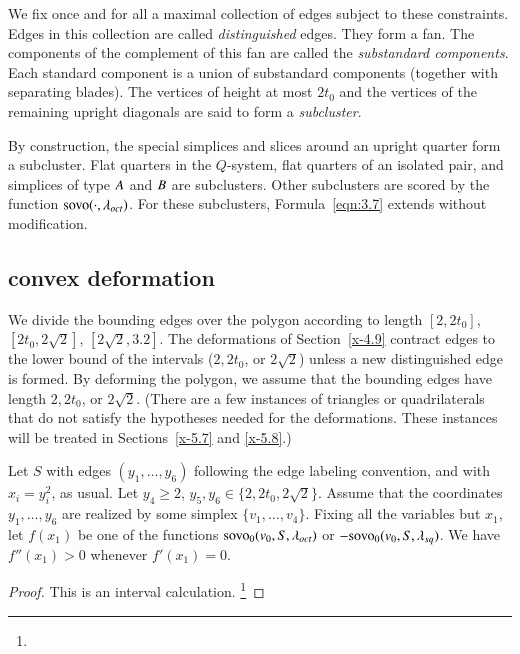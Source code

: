We fix once and for all a maximal collection of edges subject to
these constraints. Edges in this collection are called {\it
distinguished\/} edges.  They form a fan.  The components of the complement
of this fan are
called the {\it substandard components}.  Each standard component is a union of
substandard components (together with separating blades). 
The vertices of height at most $2t_0$ and the vertices
of the remaining upright diagonals are said to form a {\it
subcluster}.


By construction, the special simplices and slices
around an upright quarter form a subcluster.  Flat quarters in the
$Q$-system, flat quarters of an isolated pair, and simplices of
type $A$ and $B$ are subclusters.  Other subclusters are
scored by the function ${\operatorname{sovo}}(\cdot,\lambda_{oct})$. 
For these subclusters,
Formula~\ref{eqn:3.7} extends without modification.


\subsection{convex deformation} %
We divide the bounding edges over the polygon according to length
$[2,2t_0]$, $[2t_0,2\sqrt{2}]$, $[2\sqrt{2},3.2]$. The deformations of
Section~\ref{x-4.9} contract edges to the lower bound of the intervals
($2,2t_0$, or $2\sqrt{2}$) unless a new distinguished edge is formed. By
deforming the polygon, we assume that the bounding edges have length
$2,2t_0$, or $2\sqrt{2}$. (There are a few instances of triangles or
quadrilaterals that do not satisfy the hypotheses needed for the
deformations. These instances will be treated in Sections~\ref{x-5.7}
and \ref{x-5.8}.)

\begin{lemma}
Let $S$ with edges $(y_1,\ldots,y_6)$ following the edge labeling
convention, and with $x_i=y_i^2$,
as usual.  Let $y_4\ge 2$,
    $y_5,y_6\in\{2,2t_0,2\sqrt{2}\}$.
Assume that the coordinates $y_1,\ldots,y_6$ are realized by
some simplex $\{v_1,\ldots,v_4\}$.  %
Fixing all the variables but $x_1$, let $f(x_1)$ be one of the
functions ${\operatorname{sovo}}_0(v_0,S,\lambda_{oct})$ or 
$-{\operatorname{sovo}}_0(v_0,S,\lambda_{sq})$. We have $f''(x_1)>0$
whenever $f'(x_1)=0$.
\end{lemma}

\begin{proof} This is an interval calculation.%
\footnote{} %
\end{proof}



